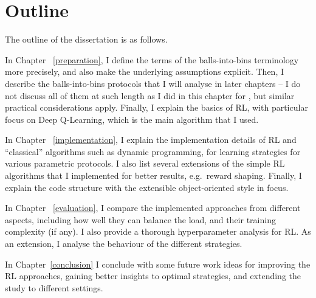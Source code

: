

\section{Outline}

The outline of the dissertation is as follows.


In Chapter ~\ref{preparation}, I define the terms of the balls-into-bins terminology more precisely, and also make the underlying assumptions explicit. Then, I describe the balls-into-bins protocols that I will analyse in later chapters -- I do not discuss all of them at such length as I did in this chapter for \TwoThinning, but similar practical considerations apply. Finally, I explain the basics of RL, with particular focus on Deep Q-Learning, which is the main algorithm that I used.


In Chapter ~\ref{implementation}, I explain the implementation details of RL and ``classical'' algorithms such as dynamic programming, for learning strategies for various parametric protocols. I also list several extensions of the simple RL algorithms that I implemented for better results, e.g.\ reward shaping. Finally, I explain the code structure with the extensible object-oriented style in focus.


In Chapter ~\ref{evaluation}, I compare the implemented approaches from different aspects, including how well they can balance the load, and their training complexity (if any). I also provide a thorough hyperparameter analysis for RL. As an extension, I analyse the behaviour of the different strategies. 

In Chapter~\ref{conclusion} I conclude with some future work ideas for improving the RL approaches, gaining better insights to optimal strategies, and extending the study to different settings.
